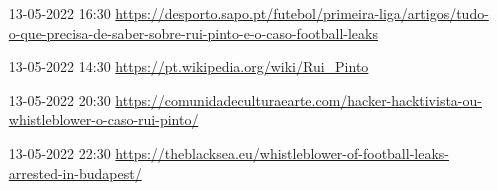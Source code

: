

\begin{itemize}
    \item [13-05-2022 16:30 ] \url{https://desporto.sapo.pt/futebol/primeira-liga/artigos/tudo-o-que-precisa-de-saber-sobre-rui-pinto-e-o-caso-football-leaks}
    \item [13-05-2022 14:30 ] \url{https://pt.wikipedia.org/wiki/Rui_Pinto}
    \item [13-05-2022 20:30 ] \url{https://comunidadeculturaearte.com/hacker-hacktivista-ou-whistleblower-o-caso-rui-pinto/}
    \item [13-05-2022 22:30 ] \url{https://theblacksea.eu/whistleblower-of-football-leaks-arrested-in-budapest/}
    
\end{itemize}